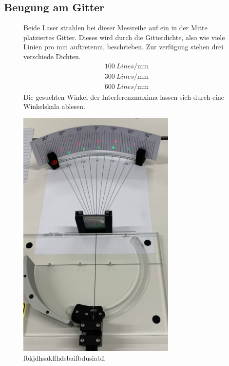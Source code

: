 \subsection{Beugung am Gitter}
\begin{figure}
\begin{minipage}{0.5\textwidth}
Beide Laser strahlen bei dieser Messreihe auf ein in der Mitte platziertes Gitter. Dieses wird durch die Gitterdichte, also wie viele
Linien pro $\si{\milli\meter}$ auftretenm, beschrieben. Zur verfügung stehen drei verschiede Dichten. 
\begin{align*}
    \SI{100}{Lines \per \milli\meter} \\
    \SI{300}{Lines \per \milli\meter} \\
    \SI{600}{Lines \per \milli\meter} 
\end{align*}
Die gesuchten Winkel der Interferenzmaxima lassen sich durch eine Winkelskala ablesen.
\end{minipage}
\hfill
\begin{minipage}{0.5\textwidth}
        \centering
        \includegraphics[width=0.7\textwidth]{bilder/gitter.png}
        \caption{fbkjdhsaklfhdsbaifbdusiabfi}
    \end{minipage}
\end{figure}




